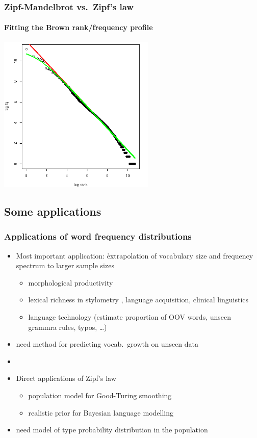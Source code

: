 \documentclass[t]{beamer} %
\begin{document}
\begin{frame}
  \frametitle{Zipf-Mandelbrot vs.\ Zipf's law} 
  \framesubtitle{Fitting the Brown rank/frequency profile}

  \ungap[1.5]
  \begin{center}
    \includegraphics[height=7.5cm]{img/brown-zipf-man-rf}
  \end{center}
\end{frame}

\subsection{Some applications}

\begin{frame}
  \frametitle{Applications of word frequency distributions}

  \begin{itemize}
  \item Most important application: \h{extrapolation} of vocabulary size and
    frequency spectrum to larger sample sizes
    \begin{itemize}
    \item morphological productivity \citep[e.g.][]{Luedeling:Evert:05}
    \item lexical richness in stylometry \citep{Efron:Thisted:76}, language acquisition, clinical linguistics \citep{Garrard:etc:05}
    \item language technology (estimate proportion of OOV words, unseen grammra rules, typos, \ldots)
    \end{itemize}
  \item[\hand] need method for predicting vocab.\ growth on unseen data
  \item[]\pause
  \item Direct applications of Zipf's law
    \begin{itemize}
    \item population model for Good-Turing smoothing \citep{Good:53,Gale:Sampson:95}
    \item realistic prior for Bayesian language modelling
    \end{itemize}
  \item[\hand] need model of type probability distribution in the population
  \end{itemize}
\end{frame}
\end{document}
